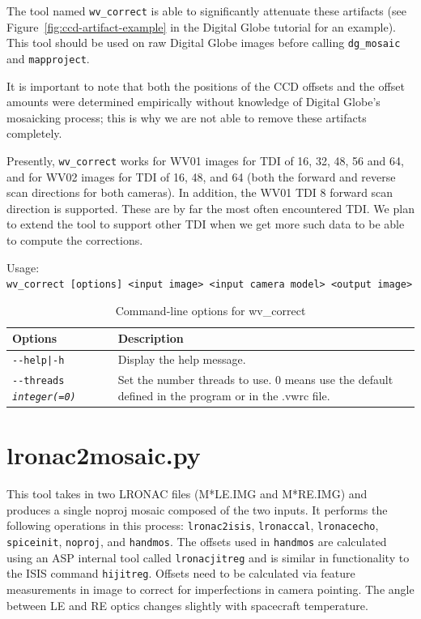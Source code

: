 The tool named \texttt{wv\_correct} is able to significantly attenuate
these artifacts (see Figure~\ref{fig:ccd-artifact-example} in the
Digital Globe tutorial for an example). This tool should be used on raw
Digital Globe images before calling \texttt{dg\_mosaic} and
\texttt{mapproject}.

It is important to note that both the positions of the CCD offsets and
the offset amounts were determined empirically without knowledge of
Digital Globe's mosaicking process; this is why we are not able to
remove these artifacts completely.

Presently, \texttt{wv\_correct} works for WV01 images for TDI of 16, 32,
48, 56 and 64, and for WV02 images for TDI of 16, 48, and 64 (both the
forward and reverse scan directions for both cameras). In addition, the WV01
TDI 8 forward scan direction is supported. These are by far the most
often encountered TDI. We plan to extend the tool to support other TDI
when we get more such data to be able to compute the corrections.

\medskip

Usage:\\
\hspace*{2em}\texttt{wv\_correct [options] <input image> <input camera model> <output image>}

\medskip

\begin{longtable}{|p{8cm}|p{9cm}|}
\caption{Command-line options for wv\_correct}
\label{tbl:wvcorrect}
\endfirsthead
\endhead
\endfoot
\endlastfoot
\hline
Options & Description \\ \hline \hline
\texttt{-\/-help|-h} & Display the help message.\\ \hline
\texttt{-\/-threads \textit{integer(=0)}} & Set the number threads to
use. 0 means use the default defined in the program or in the .vwrc file. \\ \hline
\end{longtable}

\section{lronac2mosaic.py}
\label{lronac2mosaic}

This tool takes in two LRONAC files (M*LE.IMG and M*RE.IMG) and
produces a single noproj mosaic composed of the two inputs.  It
performs the following operations in this process:
\texttt{lronac2isis}, \texttt{lronaccal}, \texttt{lronacecho},
\texttt{spiceinit}, \texttt{noproj}, and \texttt{handmos}. The offsets
used in \texttt{handmos} are calculated using an ASP internal tool
called \texttt{lronacjitreg} and is similar in functionality to the
ISIS command \texttt{hijitreg}. Offsets need to be calculated via
feature measurements in image to correct for imperfections in camera
pointing. The angle between LE and RE optics changes slightly with
spacecraft temperature.

